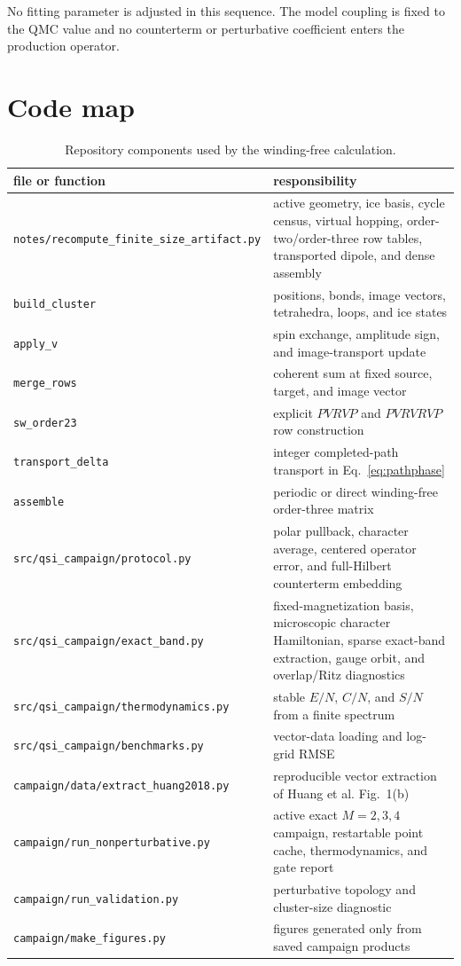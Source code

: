 \documentclass[11pt]{article}
\newcommand{\code}[1]{\texttt{#1}}
\begin{document}
No fitting parameter is adjusted in this sequence.  The model coupling is
fixed to the QMC value and no counterterm or perturbative coefficient enters
the production operator.

\section{Code map}

\begin{table}[htbp]
\caption{Repository components used by the winding-free calculation.}
\label{tab:note_code_map}
\centering
\begin{tabularx}{\textwidth}{p{}X}
\toprule
file or function & responsibility\\
\midrule
\nolinkurl{notes/recompute_finite_size_artifact.py} & active geometry, ice basis,
cycle census, virtual hopping, order-two/order-three row tables, transported
dipole, and dense assembly\\
\code{build\_cluster} & positions, bonds, image vectors, tetrahedra, loops,
and ice states\\
\code{apply\_v} & spin exchange, amplitude sign, and image-transport update\\
\code{merge\_rows} & coherent sum at fixed source, target, and image vector\\
\code{sw\_order23} & explicit $PVRVP$ and $PVRVRVP$ row construction\\
\code{transport\_delta} & integer completed-path transport in
Eq.~\eqref{eq:pathphase}\\
\code{assemble} & periodic or direct winding-free order-three matrix\\
\nolinkurl{src/qsi_campaign/protocol.py} & polar pullback, character average,
centered operator error, and full-Hilbert counterterm embedding\\
\nolinkurl{src/qsi_campaign/exact_band.py} & fixed-magnetization basis,
microscopic character Hamiltonian, sparse exact-band extraction, gauge orbit,
and overlap/Ritz diagnostics\\
\nolinkurl{src/qsi_campaign/thermodynamics.py} & stable $E/N$, $C/N$, and $S/N$
from a finite spectrum\\
\nolinkurl{src/qsi_campaign/benchmarks.py} & vector-data loading and log-grid RMSE\\
\nolinkurl{campaign/data/extract_huang2018.py} & reproducible vector extraction of
Huang et al. Fig.~1(b)\\
\nolinkurl{campaign/run_nonperturbative.py} & active exact $M=2,3,4$ campaign,
restartable point cache, thermodynamics, and gate report\\
\nolinkurl{campaign/run_validation.py} & perturbative topology and cluster-size diagnostic\\
\nolinkurl{campaign/make_figures.py} & figures generated only from saved campaign
products\\
\bottomrule
\end{tabularx}
\end{table}
\end{document}

